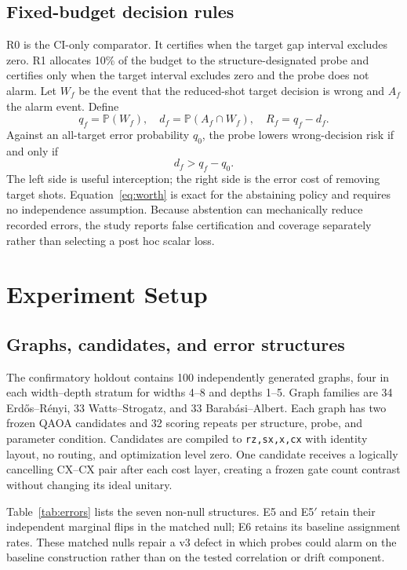 \documentclass[10pt,twocolumn]{article}
\newcommand{\Prb}{\mathbb{P}}
\newcommand{\code}[1]{\texttt{#1}}
\begin{document}
\subsection{Fixed-budget decision rules}\label{sec:rules}

R0 is the CI-only comparator. It certifies when the target gap interval excludes
zero. R1 allocates 10\% of the budget to the structure-designated probe and
certifies only when the target interval excludes zero and the probe does not
alarm. Let $W_f$ be the event that the reduced-shot target decision is wrong
and $A_f$ the alarm event. Define
\begin{equation}
  q_f=\Prb(W_f),\quad d_f=\Prb(A_f\cap W_f),\quad R_f=q_f-d_f.
\end{equation}
Against an all-target error probability $q_0$, the probe lowers wrong-decision
risk if and only if
\begin{equation}
  d_f>q_f-q_0.
  \label{eq:worth}
\end{equation}
The left side is useful interception; the right side is the error cost of
removing target shots. Equation~\eqref{eq:worth} is exact for the abstaining
policy and requires no independence assumption. Because abstention can
mechanically reduce recorded errors, the study reports false certification and
coverage separately rather than selecting a post hoc scalar loss.

\section{Experiment Setup}

\subsection{Graphs, candidates, and error structures}

The confirmatory holdout contains 100 independently generated graphs, four in
each width--depth stratum for widths 4--8 and depths 1--5. Graph families are
34 Erd\H{o}s--R\'enyi, 33 Watts--Strogatz, and 33 Barab\'asi--Albert. Each graph
has two frozen QAOA candidates and 32 scoring repeats per structure, probe, and
parameter condition. Candidates are compiled to \code{rz,sx,x,cx} with identity
layout, no routing, and optimization level zero. One candidate receives a
logically cancelling CX--CX pair after each cost layer, creating a frozen gate
count contrast without changing its ideal unitary.

Table~\ref{tab:errors} lists the seven non-null structures. E5 and E5$'$ retain
their independent marginal flips in the matched null; E6 retains its baseline
assignment rates. These matched nulls repair a v3 defect in which probes could
alarm on the baseline construction rather than on the tested correlation or
drift component.
\end{document}
